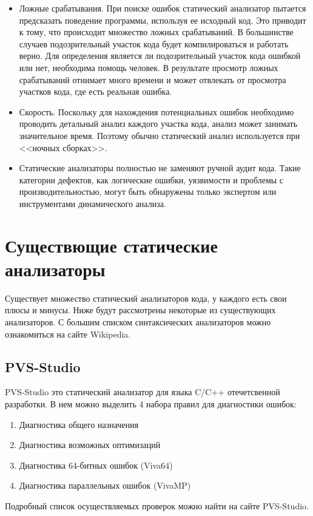 \begin{itemize}
	\item Ложные срабатывания.
	При поиске ошибок статический анализатор пытается предсказать поведение программы, используя
ее исходный код. Это приводит к тому, что происходит множество ложных срабатываний. В большинстве случаев 
подозрительный участок кода будет компилироваться и работать верно. Для определения является ли  
подозрительный участок кода ошибкой или нет, необходима помощь человек. В результате просмотр 
ложных срабатываний отнимает много времени и может отвлекать от просмотра участков кода, 
где есть реальная ошибка.
	
	\item Скорость.
	Поскольку для нахождения потенциальных ошибок необходимо проводить детальный анализ каждого
участка кода, анализ может занимать значительное время. Поэтому обычно статический анализ используется 
при <<ночных сборках>>.
	
	\item Статические анализаторы полностью не заменяют ручной аудит кода. 
	Такие категории дефектов, как логические ошибки, уязвимости и проблемы с производительностью,
могут быть обнаружены только экспертом или инструментами динамического анализа.
\end{itemize}

\section{Существющие статические анализаторы}

Существует множество статический анализаторов кода, у каждого есть свои плюсы и минусы. 
Ниже будут рассмотрены некоторые из существующих анализаторов. С большим списком синтаксических
анализаторов можно ознакомиться на сайте Wikipedia\cite{analysWiki}.

\subsection{PVS-Studio}
PVS-Studio это статический анализатор для языка C/C++ отечетсвенной разработки. В нем можно 
выделить 4 набора правил для диагностики ошибок:
\begin{enumerate}
	\item Диагностика общего назначения
	\item Диагностика возможных оптимизаций
	\item Диагностика 64-битных ошибок (Viva64)
	\item Диагностика параллельных ошибок (VivaMP)
\end{enumerate}
Подробный список осуществляемых проверок можно найти на сайте PVS-Studio\cite{pvs}.

